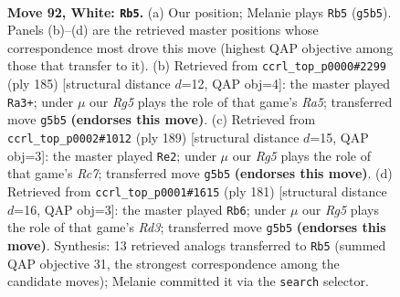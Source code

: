 \documentclass[11pt]{article}
\begin{document}
\clearpage

\begin{figure}[p]\centering
\begin{subfigure}{0.46\textwidth}\centering
\resizebox{\linewidth}{!}{%
\newchessgame
\chessboard[
  setfen={7k/B7/4r3/6R1/4p3/1K3p1P/5P2/8 w - - 9 92},
  showmover=false,
  pgfstyle=straightmove, color=movearrow, markmove={g5-b5}
]}
\caption{}
\end{subfigure}\hfill
\begin{subfigure}{0.46\textwidth}\centering
\resizebox{\linewidth}{!}{%
\newchessgame
\chessboard[
  setfen={8/8/7k/5R2/r5p1/3K2P1/5P2/8 b - - 91 93},
  showmover=false,
  pgfstyle=straightmove, color=movearrow, markmove={a4-a3}
]}
\caption{}
\end{subfigure}
\\[4pt]
\begin{subfigure}{0.46\textwidth}\centering
\resizebox{\linewidth}{!}{%
\newchessgame
\chessboard[
  setfen={8/6k1/3K4/6Pp/5R1P/8/2r5/8 b - - 16 95},
  showmover=false,
  pgfstyle=straightmove, color=movearrow, markmove={c2-e2}
]}
\caption{}
\end{subfigure}\hfill
\begin{subfigure}{0.46\textwidth}\centering
\resizebox{\linewidth}{!}{%
\newchessgame
\chessboard[
  setfen={8/2R5/3r1p1k/5P2/4P3/4K3/8/8 b - - 18 91},
  showmover=false,
  pgfstyle=straightmove, color=movearrow, markmove={d6-b6}
]}
\caption{}
\end{subfigure}
\caption{\textbf{Move 92, White: \texttt{Rb5}.} (a) Our position; Melanie plays \texttt{Rb5} (\texttt{g5b5}). Panels (b)--(d) are the retrieved master positions whose correspondence most drove this move (highest QAP objective among those that transfer to it). (b) Retrieved from \texttt{ccrl\_top\_p0000\#2299} (ply 185) [structural distance $d$=12, QAP obj=4]: the master played \texttt{Ra3+}; under $\mu$ our \emph{Rg5} plays the role of that game's \emph{Ra5}; transferred move \texttt{g5b5} \textbf{(endorses this move)}. (c) Retrieved from \texttt{ccrl\_top\_p0002\#1012} (ply 189) [structural distance $d$=15, QAP obj=3]: the master played \texttt{Re2}; under $\mu$ our \emph{Rg5} plays the role of that game's \emph{Rc7}; transferred move \texttt{g5b5} \textbf{(endorses this move)}. (d) Retrieved from \texttt{ccrl\_top\_p0001\#1615} (ply 181) [structural distance $d$=16, QAP obj=3]: the master played \texttt{Rb6}; under $\mu$ our \emph{Rg5} plays the role of that game's \emph{Rd3}; transferred move \texttt{g5b5} \textbf{(endorses this move)}. Synthesis: 13 retrieved analogs transferred to \texttt{Rb5} (summed QAP objective 31, the strongest correspondence among the candidate moves); Melanie committed it via the \texttt{search} selector.}
\label{fig:thought-m182}
\end{figure}
\end{document}

